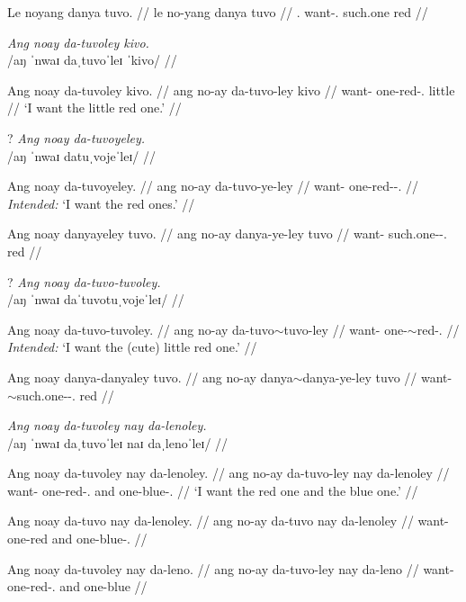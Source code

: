 \documentclass[12pt,a4paper]{scrartcl}
\newcommand{\PargI}{{\Parg}.{\Inan}}
\newcommand{\PatTI}{{\PatT}.{\Inan}}
\newcommand{\til}{$\sim$} %
\begin{document}
\a\begingl
\gla Le noyang danya tuvo. //
\glb le no-yang danya tuvo //
\glc \PatTI{} want-\Fsg{}.\Aarg{} such.one red //
\endgl

\xe

\ex\begingl
\glpreamble \textit{Ang noay da-tuvoley kivo.} \\
	/aŋ ˈnwaɪ daˌtuvoˈleɪ ˈkivo/ //

\gla Ang noay da-tuvoley kivo. //
\glb ang no-ay da-tuvo-ley kivo //
\glc \AgtT{} want-\Fsg{} one-red-\PargI{} little //
\glft `I want the little red one.' //
\endgl
\xe

\pex
\a\ljudge?\begingl
\glpreamble \textit{Ang noay da-tuvoyeley.} \\
	/aŋ ˈnwaɪ datuˌvojeˈleɪ/ //

\gla Ang noay da-tuvoyeley. //
\glb ang no-ay da-tuvo-ye-ley //
\glc \AgtT{} want-\Fsg{} one-red-\Pl{}-\PargI{} //
\glft \textit{Intended:} `I want the red ones.' //
\endgl

\a\ljudge*\begingl
\gla Ang noay danyayeley tuvo. //
\glb ang no-ay danya-ye-ley tuvo //
\glc \AgtT{} want-\Fsg{} such.one-\Pl{}-\PargI{} red //
\endgl
\xe

\pex
\a\ljudge?\begingl
\glpreamble \textit{Ang noay da-tuvo-tuvoley.} \\
	/aŋ ˈnwaɪ daˈtuvotuˌvojeˈleɪ/ //

\gla Ang noay da-tuvo-tuvoley. //
\glb ang no-ay da-tuvo\til{}tuvo-ley //
\glc \AgtT{} want-\Fsg{} one-\Dim{}\til{}red-\PargI{} //
\glft \textit{Intended:} `I want the (cute) little red one.' //
\endgl

\a\ljudge*\begingl
\gla Ang noay danya-danyaley tuvo. //
\glb ang no-ay danya\til{}danya-ye-ley tuvo //
\glc \AgtT{} want-\Fsg{} \Dim{}\til{}such.one-\Pl{}-\PargI{} red //
\endgl

\xe

\pex
\a\begingl
\glpreamble \textit{Ang noay da-tuvoley nay da-lenoley.} \\
	/aŋ ˈnwaɪ daˌtuvoˈleɪ naɪ daˌlenoˈleɪ/ //

\gla Ang noay da-tuvoley nay da-lenoley. //
\glb ang no-ay da-tuvo-ley nay da-lenoley //
\glc \AgtT{} want-\Fsg{} one-red-\PargI{} and one-blue-\PargI{} //
\glft `I want the red one and the blue one.' //
\endgl

\a\ljudge*\begingl
\gla Ang noay da-tuvo nay da-lenoley. //
\glb ang no-ay da-tuvo nay da-lenoley //
\glc \AgtT{} want-\Fsg{} one-red and one-blue-\PargI{} //
\endgl

\a\ljudge*\begingl
\gla Ang noay da-tuvoley nay da-leno. //
\glb ang no-ay da-tuvo-ley nay da-leno //
\glc \AgtT{} want-\Fsg{} one-red-\PargI{} and one-blue //
\endgl
\end{document}
